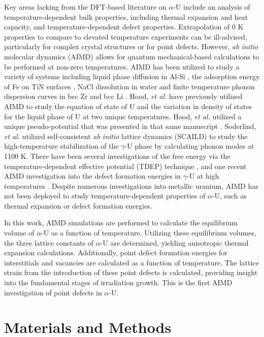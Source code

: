\documentclass[utf8]{frontiersSCNS} %
\begin{document}
Key areas lacking from the DFT-based literature on $\alpha$-U include an analysis of temperature-dependent bulk properties, including thermal expansion and heat capacity, and temperature-dependent defect properties. Extrapolation of 0 K properties to compare to elevated temperature experiments can be ill-advised, particularly for complex crystal structures or for point defects. However, \textit{ab initio} molecular dynamics (AIMD) allows for quantum mechanical-based calculations to be performed at non-zero temperatures. AIMD has been utilized to study a variety of systems including liquid phase diffusion in Al-Si \cite{manga2018}, the adsorption energy of Fe on TiN surfaces \cite{wang2010}, NaCl dissolution in water \cite{timko2010} and finite temperature phonon dispersion curves in bcc Zr and bcc Li \cite{hellman2011}. Hood, \textit{et al.} \cite{hood2008} have previously utilized AIMD to study the equation of state of U and the variation in density of states for the liquid phase of U at two unique temperatures. Hood, \textit{et al.} utilized a unique pseudo-potential that was presented in that same manuscript \cite{hood2008}. Soderlind, \textit{et al.} \cite{soderlind2012} utilized self-consistent \textit{ab initio} lattice dynamics (SCAILD) to study the high-temperature stabilization of the $\gamma$-U phase by calculating phonon modes at 1100 K. There have been several investigations of the free energy via the temperature-dependent effective potential (TDEP) technique \cite{hellman2013, ladygin2020, kruglov2019, bouchet2017, castellano2020}, and one recent AIMD investigation into the defect formation energies in $\gamma$-U at high temperatures \cite{beelerAIMD}. Despite numerous investigations into metallic uranium, AIMD has not been deployed to study temperature-dependent properties of $\alpha$-U, such as thermal expansion or defect formation energies. 

In this work, AIMD simulations are performed to calculate the equilibrium volume of $\alpha$-U as a function of temperature. Utilizing these equilibrium volumes, the three lattice constants of $\alpha$-U are determined, yielding anisotropic thermal expansion calculations. Additionally, point defect formation energies for interstitials and vacancies are calculated as a function of temperature. The lattice strain from the introduction of these point defects is calculated, providing insight into the fundamental stages of irradiation growth. This is the first AIMD investigation of point defects in $\alpha$-U. 

\section{Materials and Methods}
\end{document}
